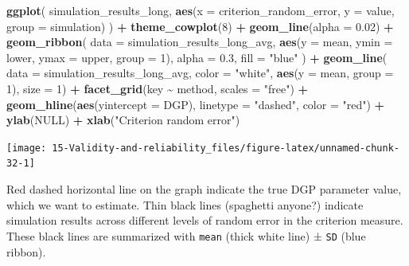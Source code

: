 \documentclass[
]{book}
\newenvironment{Shaded}{\begin{snugshade}}{\end{snugshade}}
\newcommand{\DataTypeTok}[1]{\textcolor[rgb]{0.13,0.29,0.53}{#1}}
\newcommand{\DecValTok}[1]{\textcolor[rgb]{0.00,0.00,0.81}{#1}}
\newcommand{\FloatTok}[1]{\textcolor[rgb]{0.00,0.00,0.81}{#1}}
\newcommand{\KeywordTok}[1]{\textcolor[rgb]{0.13,0.29,0.53}{\textbf{#1}}}
\newcommand{\NormalTok}[1]{#1}
\newcommand{\OperatorTok}[1]{\textcolor[rgb]{0.81,0.36,0.00}{\textbf{#1}}}
\newcommand{\OtherTok}[1]{\textcolor[rgb]{0.56,0.35,0.01}{#1}}
\newcommand{\StringTok}[1]{\textcolor[rgb]{0.31,0.60,0.02}{#1}}
\begin{document}
\begin{Shaded}
\begin{Highlighting}[]
\KeywordTok{ggplot}\NormalTok{(}
\NormalTok{  simulation\_results\_long,}
  \KeywordTok{aes}\NormalTok{(}\DataTypeTok{x =}\NormalTok{ criterion\_random\_error, }\DataTypeTok{y =}\NormalTok{ value, }\DataTypeTok{group =}\NormalTok{ simulation)}
\NormalTok{) }\OperatorTok{+}
\StringTok{  }\KeywordTok{theme\_cowplot}\NormalTok{(}\DecValTok{8}\NormalTok{) }\OperatorTok{+}
\StringTok{  }\KeywordTok{geom\_line}\NormalTok{(}\DataTypeTok{alpha =} \FloatTok{0.02}\NormalTok{) }\OperatorTok{+}
\StringTok{  }\KeywordTok{geom\_ribbon}\NormalTok{(}
    \DataTypeTok{data =}\NormalTok{ simulation\_results\_long\_avg,}
    \KeywordTok{aes}\NormalTok{(}\DataTypeTok{y =}\NormalTok{ mean, }\DataTypeTok{ymin =}\NormalTok{ lower, }\DataTypeTok{ymax =}\NormalTok{ upper, }\DataTypeTok{group =} \DecValTok{1}\NormalTok{),}
    \DataTypeTok{alpha =} \FloatTok{0.3}\NormalTok{, }\DataTypeTok{fill =} \StringTok{"blue"}
\NormalTok{  ) }\OperatorTok{+}
\StringTok{  }\KeywordTok{geom\_line}\NormalTok{(}
    \DataTypeTok{data =}\NormalTok{ simulation\_results\_long\_avg,}
    \DataTypeTok{color =} \StringTok{"white"}\NormalTok{,}
    \KeywordTok{aes}\NormalTok{(}\DataTypeTok{y =}\NormalTok{ mean, }\DataTypeTok{group =} \DecValTok{1}\NormalTok{),}
    \DataTypeTok{size =} \DecValTok{1}\NormalTok{) }\OperatorTok{+}
\StringTok{  }\KeywordTok{facet\_grid}\NormalTok{(key }\OperatorTok{\textasciitilde{}}\StringTok{ }\NormalTok{method, }\DataTypeTok{scales =} \StringTok{"free"}\NormalTok{) }\OperatorTok{+}
\StringTok{  }\KeywordTok{geom\_hline}\NormalTok{(}\KeywordTok{aes}\NormalTok{(}\DataTypeTok{yintercept =}\NormalTok{ DGP), }\DataTypeTok{linetype =} \StringTok{"dashed"}\NormalTok{, }\DataTypeTok{color =} \StringTok{"red"}\NormalTok{) }\OperatorTok{+}
\StringTok{  }\KeywordTok{ylab}\NormalTok{(}\OtherTok{NULL}\NormalTok{) }\OperatorTok{+}
\StringTok{  }\KeywordTok{xlab}\NormalTok{(}\StringTok{"Criterion random error"}\NormalTok{)}
\end{Highlighting}
\end{Shaded}

\begin{center}\texttt{[image: 15-Validity-and-reliability\_files/figure-latex/unnamed-chunk-32-1]} \end{center}

Red dashed horizontal line on the graph indicate the true DGP parameter value, which we want to estimate. Thin black lines (spaghetti anyone?) indicate simulation results across different levels of random error in the criterion measure. These black lines are summarized with \texttt{mean} (thick white line) ± \texttt{SD} (blue ribbon).
\end{document}
